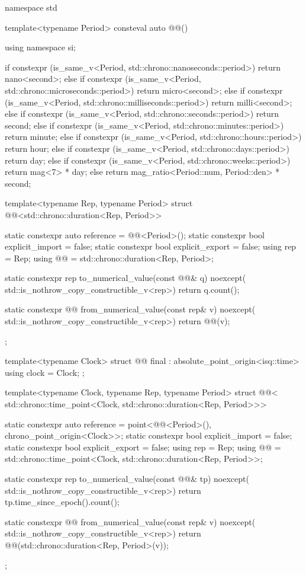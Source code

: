 \begin{codeblock}
namespace std {

template<typename Period>
consteval auto @@()
{
  using namespace si;

  if constexpr (is_same_v<Period, std::chrono::nanoseconds::period>)
    return nano<second>;
  else if constexpr (is_same_v<Period, std::chrono::microseconds::period>)
    return micro<second>;
  else if constexpr (is_same_v<Period, std::chrono::milliseconds::period>)
    return milli<second>;
  else if constexpr (is_same_v<Period, std::chrono::seconds::period>)
    return second;
  else if constexpr (is_same_v<Period, std::chrono::minutes::period>)
    return minute;
  else if constexpr (is_same_v<Period, std::chrono::hours::period>)
    return hour;
  else if constexpr (is_same_v<Period, std::chrono::days::period>)
    return day;
  else if constexpr (is_same_v<Period, std::chrono::weeks::period>)
    return mag<7> * day;
  else
    return mag_ratio<Period::num, Period::den> * second;
}

template<typename Rep, typename Period>
struct @@<std::chrono::duration<Rep, Period>> {
  static constexpr auto reference = @@<Period>();
  static constexpr bool explicit_import = false;
  static constexpr bool explicit_export = false;
  using rep = Rep;
  using @@ = std::chrono::duration<Rep, Period>;

  static constexpr rep to_numerical_value(const @@& q) noexcept(
    std::is_nothrow_copy_constructible_v<rep>)
  {
    return q.count();
  }

  static constexpr @@ from_numerical_value(const rep& v) noexcept(
    std::is_nothrow_copy_constructible_v<rep>)
  {
    return @@(v);
  }
};

template<typename Clock>
struct @@ final : absolute_point_origin<isq::time> {
  using clock = Clock;
};

template<typename Clock, typename Rep, typename Period>
struct @@<
  std::chrono::time_point<Clock, std::chrono::duration<Rep, Period>>> {
  static constexpr auto reference =
    point<@@<Period>(), chrono_point_origin<Clock>>;
  static constexpr bool explicit_import = false;
  static constexpr bool explicit_export = false;
  using rep = Rep;
  using @@ = std::chrono::time_point<Clock, std::chrono::duration<Rep, Period>>;

  static constexpr rep to_numerical_value(const @@& tp) noexcept(
    std::is_nothrow_copy_constructible_v<rep>)
  {
    return tp.time_since_epoch().count();
  }

  static constexpr @@ from_numerical_value(const rep& v) noexcept(
    std::is_nothrow_copy_constructible_v<rep>)
  {
    return @@(std::chrono::duration<Rep, Period>(v));
  }
};

}
\end{codeblock}
